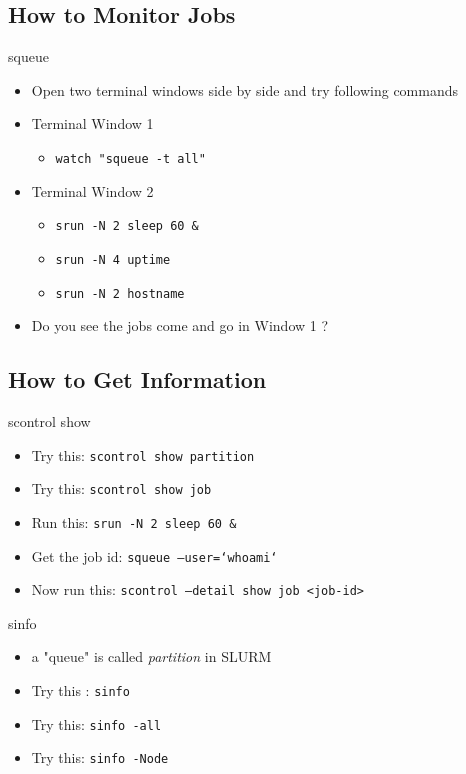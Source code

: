 \documentclass[10pt,compress]{beamer}
\begin{document}
\subsection{How to Monitor Jobs}
\begin{frame}{squeue}
\begin{itemize} \setlength{\itemsep}{1.5em}%
  \pause
  \item Open two terminal windows side by side and try following commands
  \pause
  \item Terminal Window 1
  \begin{itemize}
    \item \texttt{watch "squeue -t all"}
  \end{itemize}  
  \pause
  \item Terminal Window 2
   \begin{itemize}
     \item \texttt{srun -N 2 sleep 60 \&}
      \item \texttt{srun -N 4 uptime}
       \item \texttt{srun -N 2 hostname}
       \end{itemize}
  \pause
  \item Do you see the jobs come and go in Window 1 ?
\end{itemize}
\end{frame}


\subsection{How to Get Information}

\begin{frame}{scontrol show}
\begin{itemize} \setlength{\itemsep}{1.5em}%
  \pause
  \item Try this:  \texttt{scontrol show partition}
  \pause
  \item Try this: \texttt{scontrol show job}
  \pause
  \item  Run this: \texttt{srun -N 2 sleep 60 \&}
  \pause
  \item  Get the job id: \texttt{squeue --user=`whoami`}
  \pause
  \item  Now run this: \texttt{scontrol --detail show job <job-id>}
\end{itemize}
\end{frame}

\begin{frame}{sinfo}
\begin{itemize} \setlength{\itemsep}{1.5em}%
  \item a "queue" is called \textit{partition} in SLURM
  \pause
  \item Try this : \texttt{sinfo}
  \pause
  \item Try this:  \texttt{sinfo -all}
  \pause
  \item Try this: \texttt{sinfo -Node}
\end{itemize}
\end{frame}
\end{document}
